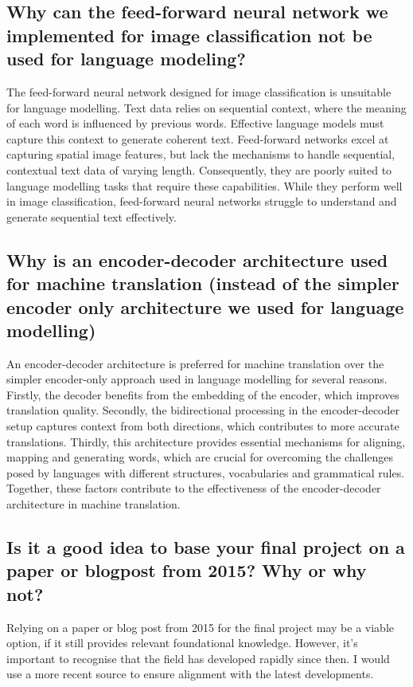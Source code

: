 \documentclass{article}
\begin{document}
\subsection{Why can the feed-forward neural network we implemented for image classification not be used for language modeling?}

The feed-forward neural network designed for image classification is unsuitable for language modelling.
Text data relies on sequential context, where the meaning of each word is influenced by previous words.
Effective language models must capture this context to generate coherent text.
Feed-forward networks excel at capturing spatial image features, but lack the mechanisms to handle sequential, contextual text data of varying length.
Consequently, they are poorly suited to language modelling tasks that require these capabilities.
While they perform well in image classification, feed-forward neural networks struggle to understand and generate sequential text effectively.


\subsection{Why is an encoder-decoder architecture used for machine translation (instead of the simpler encoder only architecture we used for language modelling)}

An encoder-decoder architecture is preferred for machine translation over the simpler encoder-only approach used in language modelling for several reasons.
Firstly, the decoder benefits from the embedding of the encoder, which improves translation quality.
Secondly, the bidirectional processing in the encoder-decoder setup captures context from both directions, which contributes to more accurate translations.
Thirdly, this architecture provides essential mechanisms for aligning, mapping and generating words, which are crucial for overcoming the challenges posed by languages with different structures, vocabularies and grammatical rules.
Together, these factors contribute to the effectiveness of the encoder-decoder architecture in machine translation.


\subsection{Is it a good idea to base your final project on a paper or blogpost from 2015? Why or why not?}

Relying on a paper or blog post from 2015 for the final project may be a viable option, if it still provides relevant foundational knowledge.
However, it's important to recognise that the field has developed rapidly since then.
I would use a more recent source to ensure alignment with the latest developments.
\end{document}
